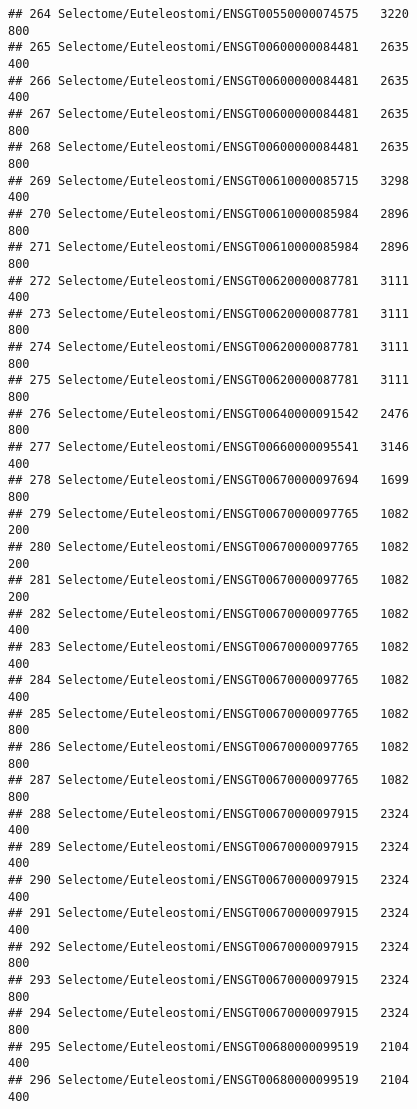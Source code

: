 \documentclass[
]{article}
\begin{document}
\begin{verbatim}
## 264 Selectome/Euteleostomi/ENSGT00550000074575   3220                   800
## 265 Selectome/Euteleostomi/ENSGT00600000084481   2635                   400
## 266 Selectome/Euteleostomi/ENSGT00600000084481   2635                   400
## 267 Selectome/Euteleostomi/ENSGT00600000084481   2635                   800
## 268 Selectome/Euteleostomi/ENSGT00600000084481   2635                   800
## 269 Selectome/Euteleostomi/ENSGT00610000085715   3298                   400
## 270 Selectome/Euteleostomi/ENSGT00610000085984   2896                   800
## 271 Selectome/Euteleostomi/ENSGT00610000085984   2896                   800
## 272 Selectome/Euteleostomi/ENSGT00620000087781   3111                   400
## 273 Selectome/Euteleostomi/ENSGT00620000087781   3111                   800
## 274 Selectome/Euteleostomi/ENSGT00620000087781   3111                   800
## 275 Selectome/Euteleostomi/ENSGT00620000087781   3111                   800
## 276 Selectome/Euteleostomi/ENSGT00640000091542   2476                   800
## 277 Selectome/Euteleostomi/ENSGT00660000095541   3146                   400
## 278 Selectome/Euteleostomi/ENSGT00670000097694   1699                   800
## 279 Selectome/Euteleostomi/ENSGT00670000097765   1082                   200
## 280 Selectome/Euteleostomi/ENSGT00670000097765   1082                   200
## 281 Selectome/Euteleostomi/ENSGT00670000097765   1082                   200
## 282 Selectome/Euteleostomi/ENSGT00670000097765   1082                   400
## 283 Selectome/Euteleostomi/ENSGT00670000097765   1082                   400
## 284 Selectome/Euteleostomi/ENSGT00670000097765   1082                   400
## 285 Selectome/Euteleostomi/ENSGT00670000097765   1082                   800
## 286 Selectome/Euteleostomi/ENSGT00670000097765   1082                   800
## 287 Selectome/Euteleostomi/ENSGT00670000097765   1082                   800
## 288 Selectome/Euteleostomi/ENSGT00670000097915   2324                   400
## 289 Selectome/Euteleostomi/ENSGT00670000097915   2324                   400
## 290 Selectome/Euteleostomi/ENSGT00670000097915   2324                   400
## 291 Selectome/Euteleostomi/ENSGT00670000097915   2324                   400
## 292 Selectome/Euteleostomi/ENSGT00670000097915   2324                   800
## 293 Selectome/Euteleostomi/ENSGT00670000097915   2324                   800
## 294 Selectome/Euteleostomi/ENSGT00670000097915   2324                   800
## 295 Selectome/Euteleostomi/ENSGT00680000099519   2104                   400
## 296 Selectome/Euteleostomi/ENSGT00680000099519   2104                   400

\end{verbatim}
\end{document}
